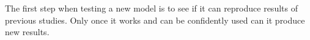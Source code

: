 The first step when testing a new model is to see if it can reproduce results of previous studies. Only once it works and can be confidently used can it produce new results.




